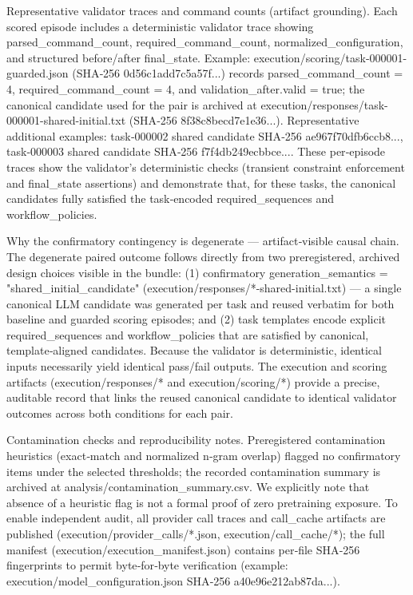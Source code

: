 \documentclass[conference]{IEEEtran}
\begin{document}
Representative validator traces and command counts (artifact grounding). Each scored episode includes a deterministic validator trace showing parsed\_command\_count, required\_command\_count, normalized\_configuration, and structured before/after final\_state. Example: execution/scoring/task-000001-guarded.json (SHA‑256 0d56c1add7c5a57f...) records parsed\_command\_count = 4, required\_command\_count = 4, and validation\_after.valid = true; the canonical candidate used for the pair is archived at execution/responses/task-000001-shared-initial.txt (SHA‑256 8f38c8becd7e1e36...). Representative additional examples: task‑000002 shared candidate SHA‑256 ae967f70dfb6ccb8..., task‑000003 shared candidate SHA‑256 f7f4db249ecbbce.... These per‑episode traces show the validator's deterministic checks (transient constraint enforcement and final\_state assertions) and demonstrate that, for these tasks, the canonical candidates fully satisfied the task‑encoded required\_sequences and workflow\_policies.

Why the confirmatory contingency is degenerate --- artifact‑visible causal chain. The degenerate paired outcome follows directly from two preregistered, archived design choices visible in the bundle: (1) confirmatory generation\_semantics = "shared\_initial\_candidate" (execution/responses/*-shared-initial.txt) --- a single canonical LLM candidate was generated per task and reused verbatim for both baseline and guarded scoring episodes; and (2) task templates encode explicit required\_sequences and workflow\_policies that are satisfied by canonical, template‑aligned candidates. Because the validator is deterministic, identical inputs necessarily yield identical pass/fail outputs. The execution and scoring artifacts (execution/responses/* and execution/scoring/*) provide a precise, auditable record that links the reused canonical candidate to identical validator outcomes across both conditions for each pair.

Contamination checks and reproducibility notes. Preregistered contamination heuristics (exact‑match and normalized n‑gram overlap) flagged no confirmatory items under the selected thresholds; the recorded contamination summary is archived at analysis/contamination\_summary.csv. We explicitly note that absence of a heuristic flag is not a formal proof of zero pretraining exposure. To enable independent audit, all provider call traces and call\_cache artifacts are published (execution/provider\_calls/*.json, execution/call\_cache/*); the full manifest (execution/execution\_manifest.json) contains per‑file SHA‑256 fingerprints to permit byte‑for‑byte verification (example: execution/model\_configuration.json SHA‑256 a40e96e212ab87da...).
\end{document}

